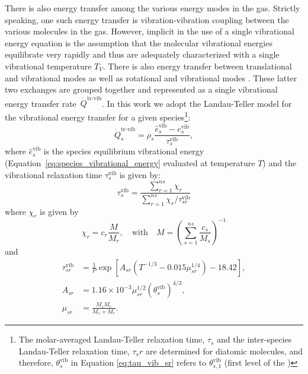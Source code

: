 \documentclass[10pt]{article}
\newcommand{\vib}{\text{vib}}
\begin{document}
There is also energy transfer among the various energy modes in the gas.  Strictly speaking, one such energy transfer is vibration-vibration coupling between the various molecules in the gas.  However, implicit in the use of a single vibrational energy equation is the assumption that the molecular vibrational energies equilibrate very rapidly and thus are adequately characterized with a single vibrational temperature $T_V$.  There is also energy transfer between translational and vibrational modes as well as rotational and vibrational modes \citep{Kirk2011}.  These latter two exchanges are grouped together and represented as a single vibrational energy transfer rate~$\dot{Q}^{\text{tr-vib}}$.  
In this work we adopt the Landau-Teller model for the vibrational energy transfer for a given species\footnote{The molar-averaged Landau-Teller relaxation time, $\tau_s$ and the inter-species Landau-Teller relaxation time, $\tau_sr$ are determined for diatomic molecules, and therefore, $\theta_{s}^\vib$ in Equation \ref{eq:tau_vib_sr} refers to $\theta_{s,1}^\vib$ (first level of the )}:
\begin{equation}
  \label{eq:landau_teller_energy_exchange}
  \dot{Q}^{\text{tr-vib}}_s = \rho_s \frac{\hat{e}^{\text{vib}}_{s} - e^{\text{vib}}_s}{\tau^{\text{vib}}_s},
\end{equation}
where $\hat{e}^{\text{vib}}_{s}$ is the species equilibrium vibrational energy (Equation~\eqref{eq:species_vibrational_energy} evaluated at temperature $T$) and the vibrational relaxation time $\tau^{\text{vib}}_s$ is given by:
\begin{equation}
  \tau^{\text{vib}}_s = \frac{\sum_{r=1}^{ns} \chi_r}{\sum_{r=1}^{ns} \chi_r/\tau^{\text{vib}}_{sr}}
\end{equation}
where $\chi_r$ is given by
\begin{equation}
  \label{eq:chi_definition}
  \chi_r = c_r\frac{M}{M_r},\quad \mbox{with}\quad M=\left(\sum_{s=1}^{ns}\frac{c_s}{M_s}\right)^{-1}
\end{equation}
and
\begin{align}
  \label{eq:tau_vib_sr}
  \tau^{\text{vib}}_{sr} &=  \frac{1}{P} \exp\left[A_{sr}\left(T^{-1/3} - 0.015 \mu^{1/4}_{sr}\right) - 18.42\right] ,\\
          A_{sr} &= 1.16\times 10^{-3} \mu^{1/2}_{sr}(\theta_{s}^\vib)^{4/3} ,\\
        \mu_{sr} &= \frac{M_s M_r}{M_s + M_r}.
\end{align}
\end{document}
